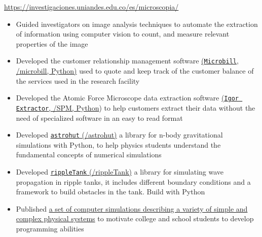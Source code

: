 \documentclass[11pt, letterpaper, sans]{moderncv}
\begin{document}
    {
        \url{https://investigaciones.uniandes.edu.co/es/microscopia/}
        \vspace{3pt}
        \begin{itemize}
            \item Guided investigators on image analysis techniques to automate the extraction of information using computer vision to count, and measure relevant properties of the image
            \item Developed the customer relationship management software \href{https://github.com/jsbarbosa/microbill}{\color{color1}(\texttt{Microbill}, \faGithub/microbill, \color{color3}Python)} used to quote and keep track of the customer balance of the services used in the research facility
            \item Developed the Atomic Force Microscope data extraction software
            \href{https://github.com/jsbarbosa/SPM}{\color{color1}(\texttt{Igor Extractor}, \faGithub/SPM, \color{color3} Python}) to help customers extract their data without the need of specialized software in an easy to read format
        \end{itemize}
    }

    {
        \vspace{3pt}
        \begin{itemize}
            \item Developed \href{https://jsbarbosa.github.io/astrohut/}{\color{color1}\texttt{astrohut} (\faGithub/astrohut)} a library for n-body gravitational simulations with {\color{color3} Python}, to help physics students understand the fundamental concepts of numerical simulations 
            \item Developed \href{https://jsbarbosa.github.io/rippleTank/}{\color{color1}\texttt{rippleTank} (\faGithub/rippleTank)} a library for simulating wave propagation in ripple tanks, it includes different boundary conditions and a framework to build obstacles in the tank. Build with {\color{color3} Python} 
            \item Published \href{https://github.com/ComputoCienciasUniandes/Demonstrations}{\color{color1} a set of computer simulations describing a variety of simple and complex physical systems} to motivate college and school students to develop programming abilities
        \end{itemize} 
    }
\end{document}

